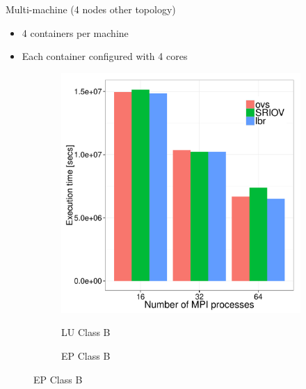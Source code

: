 \documentclass[11pt,xcolor=dvipsnames,presentation]{beamer}
\begin{document}
\begin{frame}[label=sec-3-0-13]{Multi-machine (4 nodes other topology)}
\begin{itemize}
\item 4 containers per machine
\item Each container configured with 4 cores
\end{itemize}


\begin{figure}
  \centering
  \begin{subfigure}[b]{0.42\textwidth}
    \caption{LU Class B}
    \includegraphics[scale=0.25,angle=0]{figures/inter-container-topo-luB.pdf}
    \label{fig:epkernelversion}
  \end{subfigure}
  \begin{subfigure}[b]{0.32\textwidth}
    \caption{EP Class B}

\end{subfigure}
\end{figure}
\end{frame}
\end{document}
